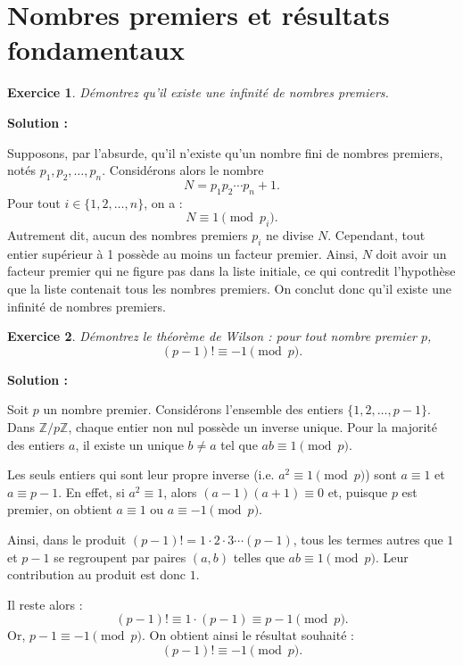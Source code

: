 \documentclass[11pt,twoside,openany]{book}
\newtheorem{exercice}{Exercice}[chapter]%
\newenvironment{solution}{\par\textbf{Solution :}\par\small}{\normalsize\par}
\begin{document}
\section{Nombres premiers et résultats fondamentaux}

\begin{exercice}
Démontrez qu'il existe une infinité de nombres premiers.
\end{exercice}

\begin{solution}
Supposons, par l'absurde, qu'il n'existe qu'un nombre fini de nombres premiers, notés $p_1, p_2, \dots, p_n$. Considérons alors le nombre
\[
N=p_1p_2\cdots p_n+1.
\]
Pour tout $i \in \{1,2,\dots,n\}$, on a :
\[
N\equiv 1 \pmod{p_i}.
\]
Autrement dit, aucun des nombres premiers $p_i$ ne divise $N$. Cependant, tout entier supérieur à 1 possède au moins un facteur premier. Ainsi, $N$ doit avoir un facteur premier qui ne figure pas dans la liste initiale, ce qui contredit l'hypothèse que la liste contenait tous les nombres premiers. On conclut donc qu'il existe une infinité de nombres premiers.
\end{solution}

\begin{exercice}
Démontrez le théorème de Wilson : pour tout nombre premier \(p\), 
\[
(p-1)! \equiv -1 \pmod{p}.
\]
\end{exercice}

\begin{solution}
Soit \(p\) un nombre premier. Considérons l'ensemble des entiers \(\{1, 2, \dots, p-1\}\). Dans \(\mathbb{Z}/p\mathbb{Z}\), chaque entier non nul possède un inverse unique. Pour la majorité des entiers \(a\), il existe un unique \(b \neq a\) tel que \(ab\equiv1\pmod{p}\).

Les seuls entiers qui sont leur propre inverse (i.e. \(a^2\equiv 1\pmod{p}\)) sont \(a\equiv 1\) et \(a\equiv p-1\). En effet, si \(a^2\equiv 1\), alors \((a-1)(a+1)\equiv 0\) et, puisque \(p\) est premier, on obtient \(a\equiv 1\) ou \(a\equiv -1\pmod{p}\).

Ainsi, dans le produit \((p-1)!=1\cdot2\cdot3\cdots (p-1)\), tous les termes autres que \(1\) et \(p-1\) se regroupent par paires \((a,b)\) telles que \(ab\equiv1\pmod{p}\). Leur contribution au produit est donc \(1\).

Il reste alors :
\[
(p-1)! \equiv 1\cdot (p-1) \equiv p-1 \pmod{p}.
\]
Or, \(p-1 \equiv -1 \pmod{p}\). On obtient ainsi le résultat souhaité :
\[
(p-1)! \equiv -1 \pmod{p}.
\]
\end{solution}
\end{document}
